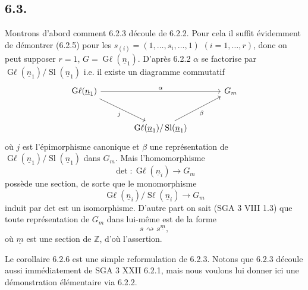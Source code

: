 
\subsection*{6.3.}
Montrons d'abord comment 6.2.3 découle de 6.2.2. Pour cela il suffit évidemment de démontrer (6.2.5) pour les
\(s_{(i)}=(1,\ldots,s_i,\ldots,1)\) \((i=1,\ldots,r)\), donc on peut supposer \(r=1\), \(G=\operatorname{G\ell}(\underline{n}_1)\). D'après 6.2.2 \(\alpha\) se factorise par \(\operatorname{G\ell}(\underline{n}_1)/\operatorname{Sl}(\underline{n}_1)\) i.e. il existe un diagramme commutatif
\[
\begin{tikzcd}[column sep=large,row sep=large]
\operatorname{G\ell}(\underline{n}_1) \arrow[rr,"\alpha"] \arrow[dr,"j"'] && {G}_m\\
& \operatorname{G\ell}(\underline{n}_1)/\operatorname{Sl}(\underline{n}_1) \arrow[ur,"\beta"'] &
\end{tikzcd}
\]
où \(j\) est l'épimorphisme canonique et \(\beta\) une représentation de \(\operatorname{G\ell}(\underline{n}_1)/\operatorname{Sl}(\underline{n}_1)\) dans \({G}_m\). Mais l'homomorphisme
\[
 \det:\operatorname{G\ell}(\underline{n}_i)\longrightarrow{G}_m
\]
possède une section, de sorte que le monomorphisme
\[
 \operatorname{G\ell}(\underline{n}_i)/\operatorname{S\ell}(\underline{n}_i)\longrightarrow{G}_m
\]
induit par det est un isomorphisme. D'autre part on sait (SGA 3 VIII 1.3) que toute représentation de \({G}_m\) dans lui-même est de la forme
\[
 s\rightsquigarrow s^{\underline{m}},
\]
où \(\underline{m}\) est une section de \(\mathbb Z\), d'où l'assertion.

Le corollaire 6.2.6 est une simple reformulation de 6.2.3. Notons que 6.2.3 découle aussi immédiatement de SGA 3 XXII 6.2.1, mais nous voulons lui donner ici une démonstration élémentaire via 6.2.2.

